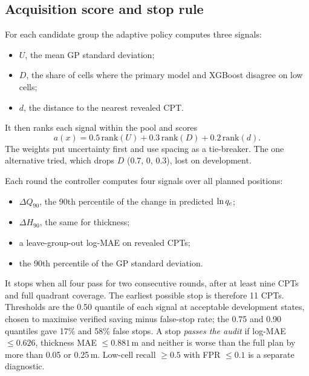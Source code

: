 \subsection{Acquisition score and stop rule}
For each candidate group the adaptive policy computes three signals:
\begin{itemize}
\item $U$, the mean GP standard deviation;
\item $D$, the share of cells where the primary model and XGBoost disagree on low cells;
\item $d$, the distance to the nearest revealed CPT.
\end{itemize}
It then ranks each signal within the pool and scores
\begin{equation}
a(x)=0.5\,\mathrm{rank}(U)+0.3\,\mathrm{rank}(D)+0.2\,\mathrm{rank}(d).
\end{equation}
The weights put uncertainty first and use spacing as a tie-breaker. The one alternative tried, which drops
$D$ (0.7, 0, 0.3), lost on development.

Each round the controller computes four signals over all planned positions:
\begin{itemize}
\item $\Delta Q_{90}$, the 90th percentile of the change in predicted $\ln q_c$;
\item $\Delta H_{90}$, the same for thickness;
\item a leave-group-out log-MAE on revealed CPTs;
\item the 90th percentile of the GP standard deviation.
\end{itemize}
It stops when all four pass for two consecutive rounds, after at least nine CPTs and full quadrant
coverage. The earliest possible stop is therefore 11 CPTs. Thresholds are the 0.50 quantile of each signal
at acceptable development states, chosen to maximise verified saving minus false-stop rate; the 0.75 and 0.90
quantiles gave 17\% and 58\% false stops. A stop \emph{passes the audit} if log-MAE $\le0.626$, thickness MAE
$\le0.881$\,m and neither is worse than the full plan by more than 0.05 or 0.25\,m. Low-cell recall
$\ge0.5$ with FPR $\le0.1$ is a separate diagnostic.

